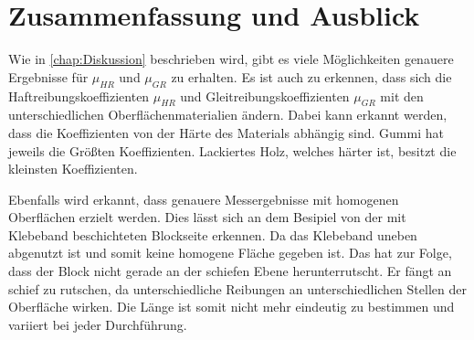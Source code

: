 \section{Zusammenfassung und Ausblick}

Wie in \autoref{chap:Diskussion} beschrieben wird, gibt es viele Möglichkeiten genauere Ergebnisse für $\mu_{HR}$ und $\mu_{GR}$ zu erhalten. Es ist auch zu erkennen, dass sich die Haftreibungskoeffizienten $\mu_{HR}$ und Gleitreibungskoeffizienten $\mu_{GR}$ mit den unterschiedlichen Oberflächenmaterialien ändern. Dabei kann erkannt werden, dass die Koeffizienten von der Härte des Materials abhängig sind. Gummi hat jeweils die Größten Koeffizienten. Lackiertes Holz, welches härter ist, besitzt die kleinsten Koeffizienten.

Ebenfalls wird erkannt, dass genauere Messergebnisse mit homogenen Oberflächen erzielt werden. Dies lässt sich an dem Besipiel von der mit Klebeband beschichteten Blockseite erkennen. Da das Klebeband uneben abgenutzt ist und somit keine homogene Fläche gegeben ist. Das hat zur Folge, dass der Block nicht gerade an der schiefen Ebene herunterrutscht. Er fängt an schief zu rutschen, da unterschiedliche Reibungen an unterschiedlichen Stellen der Oberfläche wirken. Die Länge ist somit nicht mehr eindeutig zu bestimmen und variiert bei jeder Durchführung.